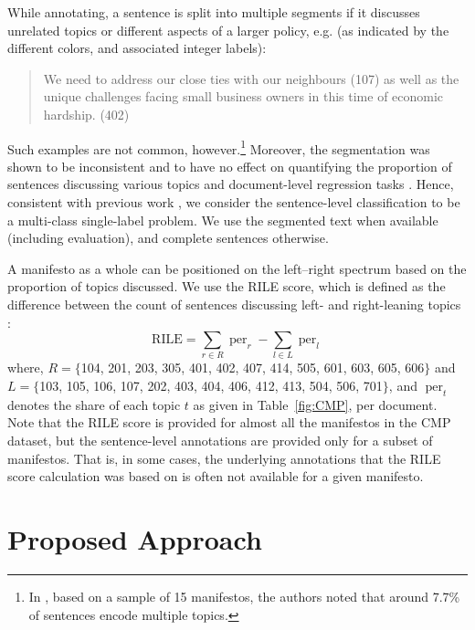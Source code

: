 \documentclass[11pt,a4paper]{article}
\DeclareMathOperator{\per}{per}
\newcommand{\tabref}[2][]{Table#1~\ref{#2}\xspace}
\begin{document}
While annotating, a sentence is split into multiple segments if it discusses unrelated topics or different aspects of a larger policy, e.g. (as indicated by the different colors, and associated integer labels):
\begin{quote}
\color{red}
We need to address our close ties with our neighbours (107) \color{blue} as well as the unique challenges facing small business owners in this time of economic hardship. (402)
\end{quote}
Such examples are not common, however.\footnote{In , based on a sample of 15 manifestos, the authors noted that around 7.7\% of sentences encode multiple topics.} Moreover, the segmentation was shown to be inconsistent and to have no effect on quantifying the proportion of sentences discussing various topics and document-level regression tasks \cite{daubler2012natural}. Hence, consistent with previous work \cite{biessmann2016automating, W17-2906}, we consider the sentence-level classification to be a multi-class single-label problem. We use the segmented text when available (including evaluation), and complete sentences otherwise.

A manifesto as a whole can be positioned on the left--right spectrum based on the proportion of topics discussed. We use the RILE score, which is defined as the difference between the count of sentences discussing left- and right-leaning topics \cite{cat}:
\begin{equation}
\text{RILE} = \sum_{r \in R} \per_{r} - \sum_{l \in L} \per_{l}
\end{equation}
where, $R = \{$104, 201, 203, 305, 401, 402, 407, 414, 505, 601, 603, 605, 606$\}$ and $L = \{$103, 105, 106, 107, 202, 403, 404, 406, 412, 413, 504, 506, 701$\}$, and $\per_{t}$ denotes the share of each topic $t$ as given in \tabref{fig:CMP}, per document.  Note that the RILE score is provided for almost all the manifestos in the CMP dataset, but the sentence-level annotations are provided only for a subset of manifestos. That is, in some cases, the underlying annotations that the RILE score calculation was based on is often not available for a given manifesto.



\section{Proposed Approach}
\end{document}
